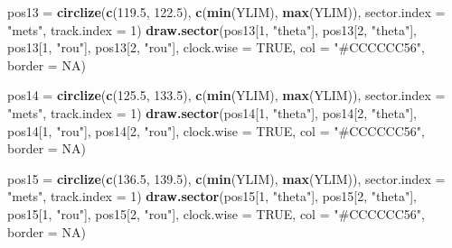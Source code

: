 \documentclass[
]{article}
\newenvironment{Shaded}{\begin{snugshade}}{\end{snugshade}}
\newcommand{\DataTypeTok}[1]{\textcolor[rgb]{0.13,0.29,0.53}{#1}}
\newcommand{\DecValTok}[1]{\textcolor[rgb]{0.00,0.00,0.81}{#1}}
\newcommand{\FloatTok}[1]{\textcolor[rgb]{0.00,0.00,0.81}{#1}}
\newcommand{\KeywordTok}[1]{\textcolor[rgb]{0.13,0.29,0.53}{\textbf{#1}}}
\newcommand{\NormalTok}[1]{#1}
\newcommand{\OtherTok}[1]{\textcolor[rgb]{0.56,0.35,0.01}{#1}}
\newcommand{\StringTok}[1]{\textcolor[rgb]{0.31,0.60,0.02}{#1}}
\begin{document}
\begin{Shaded}
\begin{Highlighting}[]
\NormalTok{pos13 =}\StringTok{ }\KeywordTok{circlize}\NormalTok{(}\KeywordTok{c}\NormalTok{(}\FloatTok{119.5}\NormalTok{, }\FloatTok{122.5}\NormalTok{), }\KeywordTok{c}\NormalTok{(}\KeywordTok{min}\NormalTok{(YLIM), }\KeywordTok{max}\NormalTok{(YLIM)), }\DataTypeTok{sector.index =} \StringTok{"mets"}\NormalTok{, }\DataTypeTok{track.index =} \DecValTok{1}\NormalTok{)}
\KeywordTok{draw.sector}\NormalTok{(pos13[}\DecValTok{1}\NormalTok{, }\StringTok{"theta"}\NormalTok{], pos13[}\DecValTok{2}\NormalTok{, }\StringTok{"theta"}\NormalTok{], pos13[}\DecValTok{1}\NormalTok{, }\StringTok{"rou"}\NormalTok{], pos13[}\DecValTok{2}\NormalTok{, }\StringTok{"rou"}\NormalTok{], }\DataTypeTok{clock.wise =} \OtherTok{TRUE}\NormalTok{, }\DataTypeTok{col =} \StringTok{"#CCCCCC56"}\NormalTok{, }\DataTypeTok{border =} \OtherTok{NA}\NormalTok{) }

\NormalTok{pos14 =}\StringTok{ }\KeywordTok{circlize}\NormalTok{(}\KeywordTok{c}\NormalTok{(}\FloatTok{125.5}\NormalTok{, }\FloatTok{133.5}\NormalTok{), }\KeywordTok{c}\NormalTok{(}\KeywordTok{min}\NormalTok{(YLIM), }\KeywordTok{max}\NormalTok{(YLIM)), }\DataTypeTok{sector.index =} \StringTok{"mets"}\NormalTok{, }\DataTypeTok{track.index =} \DecValTok{1}\NormalTok{)}
\KeywordTok{draw.sector}\NormalTok{(pos14[}\DecValTok{1}\NormalTok{, }\StringTok{"theta"}\NormalTok{], pos14[}\DecValTok{2}\NormalTok{, }\StringTok{"theta"}\NormalTok{], pos14[}\DecValTok{1}\NormalTok{, }\StringTok{"rou"}\NormalTok{], pos14[}\DecValTok{2}\NormalTok{, }\StringTok{"rou"}\NormalTok{], }\DataTypeTok{clock.wise =} \OtherTok{TRUE}\NormalTok{, }\DataTypeTok{col =} \StringTok{"#CCCCCC56"}\NormalTok{, }\DataTypeTok{border =} \OtherTok{NA}\NormalTok{) }

\NormalTok{pos15 =}\StringTok{ }\KeywordTok{circlize}\NormalTok{(}\KeywordTok{c}\NormalTok{(}\FloatTok{136.5}\NormalTok{, }\FloatTok{139.5}\NormalTok{), }\KeywordTok{c}\NormalTok{(}\KeywordTok{min}\NormalTok{(YLIM), }\KeywordTok{max}\NormalTok{(YLIM)), }\DataTypeTok{sector.index =} \StringTok{"mets"}\NormalTok{, }\DataTypeTok{track.index =} \DecValTok{1}\NormalTok{)}
\KeywordTok{draw.sector}\NormalTok{(pos15[}\DecValTok{1}\NormalTok{, }\StringTok{"theta"}\NormalTok{], pos15[}\DecValTok{2}\NormalTok{, }\StringTok{"theta"}\NormalTok{], pos15[}\DecValTok{1}\NormalTok{, }\StringTok{"rou"}\NormalTok{], pos15[}\DecValTok{2}\NormalTok{, }\StringTok{"rou"}\NormalTok{], }\DataTypeTok{clock.wise =} \OtherTok{TRUE}\NormalTok{, }\DataTypeTok{col =} \StringTok{"#CCCCCC56"}\NormalTok{, }\DataTypeTok{border =} \OtherTok{NA}\NormalTok{) }
\end{Highlighting}
\end{Shaded}
\end{document}
